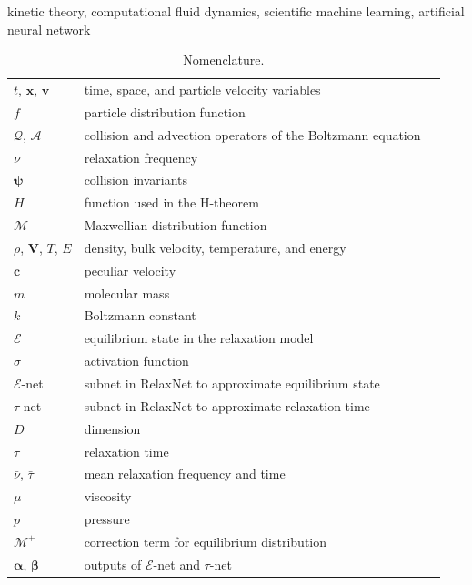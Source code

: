 \documentclass[preprint,3p,12pt,sort&compress]{elsarticle}
\begin{document}
\begin{keyword}
kinetic theory, computational fluid dynamics, scientific machine learning, artificial neural network
\end{keyword}

\maketitle

\begin{table}
	\centering
	\caption{Nomenclature.}
	\begin{tabular*}{16cm}{lll}
		\hline
		$t$, $\mathbf x$, $\mathbf v$ & time, space, and particle velocity variables \\
		$f$ & particle distribution function \\
		$\mathcal Q$, $\mathcal A$ & collision and advection operators of the Boltzmann equation \\
		$\nu$ & relaxation frequency \\
		$\boldsymbol\psi$ & collision invariants \\
		$H$ & function used in the H-theorem \\
		$\mathcal M$ & Maxwellian distribution function \\
		$\rho$, $\mathbf V$, $T$, $E$ & density, bulk velocity, temperature, and energy \\
		$\mathbf c$ & peculiar velocity \\
		$m$ & molecular mass \\
		$k$ & Boltzmann constant \\
		$\mathcal E$ & equilibrium state in the relaxation model \\
		$\sigma$ & activation function \\
		$\mathcal E$-net & subnet in RelaxNet to approximate equilibrium state \\
		$\tau$-net & subnet in RelaxNet to approximate relaxation time \\
		$D$ & dimension \\
		$\tau$ & relaxation time \\
		$\bar\nu$, $\bar\tau$ & mean relaxation frequency and time \\
		$\mu$ & viscosity \\
		$p$ & pressure \\
		$\mathcal M^+$ & correction term for equilibrium distribution \\
		$\boldsymbol\alpha$, $\boldsymbol\beta$ & outputs of $\mathcal E$-net and $\tau$-net \\

\end{tabular*}
\end{table}
\end{document}
